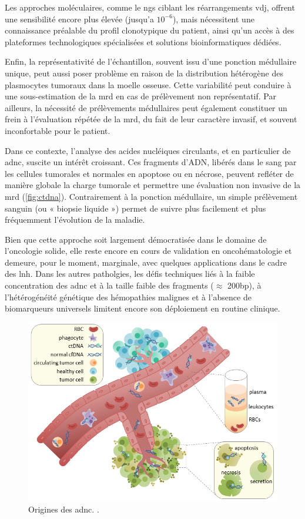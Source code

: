 Les approches moléculaires, comme le \gls{ngs} ciblant les réarrangements    \gls{vdj}, offrent une sensibilité encore plus élevée (jusqu'a $10^{-6}$),
mais nécessitent une connaissance préalable du profil clonotypique du patient, ainsi qu'un accès à des plateformes technologiques spécialisées et solutions 
bioinformatiques dédiées.

Enfin, la représentativité de l'échantillon, souvent issu d'une ponction médullaire unique, peut aussi poser problème en raison de la distribution hétérogène
des plasmocytes tumoraux dans la moelle osseuse. Cette variabilité peut conduire à une sous-estimation de la \gls{mrd} en cas de prélèvement non représentatif.
Par ailleurs, la nécessité de prélèvements médullaires peut également constituer un frein à l'évaluation répétée de la \gls{mrd}, du fait de leur caractère
invasif, et souvent inconfortable pour le patient.

Dans ce contexte, l'analyse des acides nucléiques circulants, et en particulier de \gls{adnc}, suscite un intérêt croissant. Ces fragments d'ADN, libérés dans le sang 
par les cellules tumorales et normales en apoptose ou en nécrose, peuvent refléter de manière globale la charge tumorale et permettre une évaluation non 
invasive de la \gls{mrd} (\autoref{fig:ctdna}). Contrairement à la ponction médullaire, un simple prélèvement sanguin (ou « biopsie liquide ») permet de suivre plus facilement 
et plus fréquemment l'évolution de la maladie.

Bien que cette approche soit largement démocratisée dans le domaine de l'oncologie solide, elle reste encore en cours de validation en oncohématologie et demeure,
pour le moment, marginale, avec quelques applications dans le cadre des \gls{lnh}. Dans les autres patholgies, les défis techniques liés à la faible concentration des 
\gls{adnc} et à la taille faible des fragments ($\approx$ 200bp), à l'hétérogénéité génétique des hémopathies malignes et à l'absence de biomarqueurs universels 
limitent encore son déploiement en routine clinique.

\begin{figure}[H]
    \includegraphics[width=1\textwidth]{images/ctdna.png}
    \caption{Origines des \gls{adnc}. \citeauthor{racheljunewongEnglishCirculatingTumor2017} \cite{racheljunewongEnglishCirculatingTumor2017}.}
    \label{fig:ctdna}
\end{figure}
    
